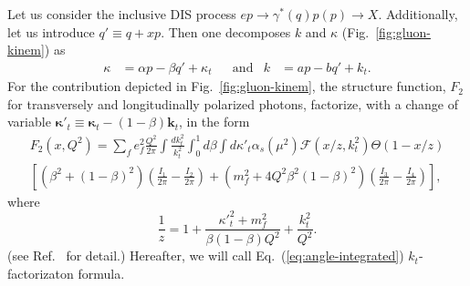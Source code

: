 \documentclass[12pt]{article}
\numberwithin{equation}{section}
\numberwithin{table}{section}
\numberwithin{figure}{section}
\begin{document}
Let us consider the inclusive DIS process $e p\rightarrow \gamma^* (q) p(p)\rightarrow X$. %
Additionally, let us introduce $q'\equiv q+x p$. 
Then one  decomposes $k$ and $\kappa$ (Fig.~\ref{fig:gluon-kinem}) as
\begin{align}
    \kappa&=\alpha p-\beta q'+\kappa_t&&\mathrm{and}& k&=a p- bq'+k_t.
\end{align}
For the contribution depicted in Fig.~\ref{fig:gluon-kinem}, the structure function, $F_2$ for transversely and longitudinally polarized photons, factorize, with a change of variable  ${\boldsymbol{\kappa}'}_t\equiv{\boldsymbol{\kappa}_t}-(1-\beta)\mathbf{k}_t$, in the form~\cite{ Kimber:2001uaa,Kwiecinski:1997ee}
\begin{multline}
	F_2(x,Q^2)=\sum_f e_f^2 \frac{Q^2}{2\pi}\int\frac{dk^2_t}{k_t^2}\int^1_0d\beta\int d{\kappa'}_t\alpha_s(\mu^2) \mathcal{F}(x/z,k_t^2)\Theta(1-x/z)\\
	\left[\left(\beta^2+(1-\beta)^2\right)\left(\frac{I_1}{2\pi}-\frac{I_2}{2\pi}\right)
	+\left(m_f^2+4Q^2\beta^2(1-\beta)^2\right)\left(\frac{I_3}{2\pi}-\frac{I_4}{2\pi}\right)\right],
	\label{eq:angle-integrated}
\end{multline}
where
\begin{equation}
	\frac{1}{z}=1+\frac{{\kappa'}^2_t+m_f^2}{\beta(1-\beta)Q^2}+\frac{k^2_t}{Q^2}.
	\label{eq:z}
\end{equation}
(see Ref.~\cite{ Kimber:2001uaa,Kwiecinski:1997ee} for detail.)
Hereafter, we will call Eq.~(\ref{eq:angle-integrated}) $k_t$-factorizaton formula.
\end{document}
